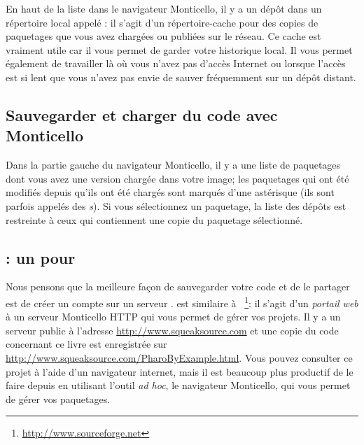\documentclass[a4paper,10pt,twoside]{book}
\begin{document}
En haut de la liste dans le navigateur Monticello, il y a un dépôt
dans un répertoire local appelé : il s'agit
d'un répertoire-cache pour des copies de paquetages que vous avez
chargées ou publiées sur le réseau. Ce cache est vraiment utile car il
vous permet de garder votre historique local. Il vous permet également
de travailler là où vous n'avez pas d'accès Internet ou lorsque 
l'accès est si lent que vous n'avez pas envie de sauver fréquemment 
sur un dépôt distant.

\subsection{Sauvegarder et charger du code avec Monticello}
Dans la partie gauche du navigateur Monticello, il y a une liste de
paquetages dont vous avez une version chargée dans votre image; les
paquetages qui ont été modifiés depuis qu'ils ont été chargés sont
marqués d'une 
astérisque
(ils sont parfois appelés des \emph{s}). 
Si vous sélectionnez un paquetage, la liste des dépôts est restreinte à ceux qui 
contiennent une copie du paquetage sélectionné.



\subsection{\ind{\sqsrc}: un  pour \pharo} 
Nous pensons que la meilleure façon de sauvegarder votre code et de le
partager est de créer un compte sur un serveur \sqsrc. \sqsrc est similaire à
\sourceforge~\footnote{\url{http://www.sourceforge.net}}: il s'agit d'un
\emph{portail web} à un serveur Monticello HTTP qui vous permet de gérer vos projets.
Il y a un serveur public \sqsrc à l'adresse
\url{http://www.squeaksource.com} et une copie du code concernant ce
livre est enregistrée sur
\url{http://www.squeaksource.com/PharoByExample.html}. Vous pouvez
consulter ce projet à l'aide d'un navigateur internet, mais il est
beaucoup plus productif de le faire depuis \pharo en utilisant
l'outil \emph{ad hoc}, le navigateur Monticello, qui vous permet de
gérer vos paquetages.
\end{document}
